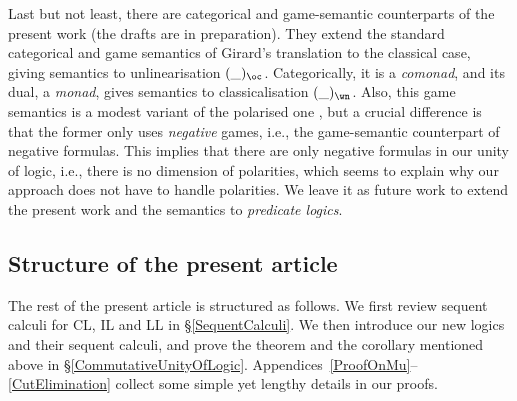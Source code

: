 \documentclass[a4paper]{article}
\theoremstyle{definition}
\theoremstyle{theorem}
\theoremstyle{remark}
\begin{document}
Last but not least, there are categorical and game-semantic counterparts of the present work (the drafts are in preparation).
They extend the standard categorical and game semantics of Girard's translation \cite{seely1987linear,mccusker1998games} to the classical case, giving semantics to unlinearisation $(\_)_\oc$.
Categorically, it is a \emph{comonad}, and its dual, a \emph{monad}, gives semantics to classicalisation $(\_)_\wn$.
Also, this game semantics is a modest variant of the polarised one \cite{laurent2002polarized}, but a crucial difference is that the former only uses \emph{negative} games, i.e., the game-semantic counterpart of negative formulas.
This implies that there are only negative formulas in our unity of logic, i.e., there is no dimension of polarities, which seems to explain why our approach does not have to handle polarities.
We leave it as future work to extend the present work and the semantics to \emph{predicate logics}.


\subsection{Structure of the present article}
The rest of the present article is structured as follows.
We first review sequent calculi for CL, IL and LL in \S\ref{SequentCalculi}.
We then introduce our new logics and their sequent calculi, and prove the theorem and the corollary mentioned above in \S\ref{CommutativeUnityOfLogic}.
Appendices~\ref{ProofOnMu}--\ref{CutElimination} collect some simple yet lengthy details in our proofs.









%
%


\end{document}
